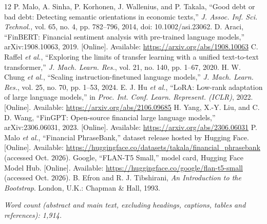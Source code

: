 \documentclass[conference,a4paper]{IEEEtran}
\begin{document}
\balance
\begingroup\small
\begin{thebibliography}{12}
 P. Malo, A. Sinha, P. Korhonen, J. Wallenius, and P. Takala, ``Good debt or bad debt: Detecting semantic orientations in economic texts,'' \emph{J. Assoc. Inf. Sci. Technol.}, vol. 65, no. 4, pp. 782--796, 2014, doi: 10.1002/asi.23062.
 D. Araci, ``FinBERT: Financial sentiment analysis with pre-trained language models,'' arXiv:1908.10063, 2019. [Online]. Available: \url{https://arxiv.org/abs/1908.10063}
 C. Raffel \emph{et al.}, ``Exploring the limits of transfer learning with a unified text-to-text transformer,'' \emph{J. Mach. Learn. Res.}, vol. 21, no. 140, pp. 1--67, 2020.
 H. W. Chung \emph{et al.}, ``Scaling instruction-finetuned language models,'' \emph{J. Mach. Learn. Res.}, vol. 25, no. 70, pp. 1--53, 2024.
 E. J. Hu \emph{et al.}, ``LoRA: Low-rank adaptation of large language models,'' in \emph{Proc. Int. Conf. Learn. Represent. (ICLR)}, 2022. [Online]. Available: \url{https://arxiv.org/abs/2106.09685}
 H. Yang, X.-Y. Liu, and C. D. Wang, ``FinGPT: Open-source financial large language models,'' arXiv:2306.06031, 2023. [Online]. Available: \url{https://arxiv.org/abs/2306.06031}
 P. Malo \emph{et al.}, ``Financial PhraseBank,'' dataset release hosted by Hugging Face. [Online]. Available: \url{https://huggingface.co/datasets/takala/financial_phrasebank} (accessed Oct. 2026).
 Google, ``FLAN-T5 Small,'' model card, Hugging Face Model Hub. [Online]. Available: \url{https://huggingface.co/google/flan-t5-small} (accessed Oct. 2026).
 B. Efron and R. J. Tibshirani, \emph{An Introduction to the Bootstrap}. London, U.K.: Chapman \& Hall, 1993.
\end{thebibliography}
\endgroup

\vspace{0.3em}
\noindent\textit{Word count (abstract and main text, excluding headings, captions, tables and references): 1,914.}
\end{document}

